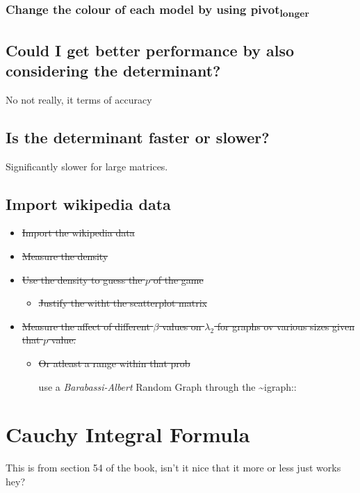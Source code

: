 \documentclass[11pt]{article}
\begin{document}
\subsubsection{Change the colour of each model by using pivot\textsubscript{longer}}
\label{sec:orgb6f08cb}
\subsection{Could I get better performance by also considering the determinant?}
\label{sec:org2de6875}
No not really, it terms of accuracy

\subsection{Is the determinant faster or slower?}
\label{sec:orga073388}
Significantly slower for large matrices.
\subsection{Import wikipedia data}
\label{sec:org74da214}
\begin{itemize}
\item \sout{Import the wikipedia data}
\item \sout{Measure the density}
\item \sout{Use the density to guess the \(p\) of the game}
\begin{itemize}
\item \sout{Justify the witht the scatterplot matrix}
\end{itemize}
\item \sout{Measure the affect of different \(\beta\) values on \(\lambda_2\) for graphs ov various sizes given that \(p\) value.}
\begin{itemize}
\item \sout{Or atleast a range within that prob}

use a \emph{Barabassi-Albert} Random Graph through the \textasciitilde{}igraph::
\end{itemize}
\end{itemize}

\section{Cauchy Integral Formula}
\label{cauchy-integral-formula}
This is from section 54 of the book, isn't it nice that it more or less
just works hey? \cite{zhangMakingEigenvectorBasedReputation2004}
\end{document}
